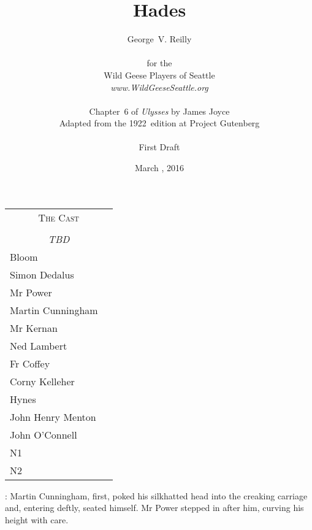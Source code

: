 


\title{\Huge Hades}
\author{George~V. Reilly\\
\\
{\small for the}\\
Wild Geese Players of Seattle\\
{\emph{www.WildGeeseSeattle.org}}\\
\\
{\small Chapter~6 of \emph{Ulysses} by James Joyce}\\
{\small Adapted from the 1922~edition at Project Gutenberg}
\\
\\
{\small First Draft}}
\date{March , 2016}
\raggedbottom



\maketitle
\thispagestyle{empty}
\pagebreak

\begin{tabular}{lp{10cm}}
    \multicolumn{2}{c}{\Large \textsc{The Cast}} \\
\\
    \multicolumn{2}{c}{\large \textit{TBD}} \\
Bloom \\
Simon Dedalus \\
Mr Power \\
Martin Cunningham \\
Mr Kernan \\
Ned Lambert \\
Fr Coffey \\
Corny Kelleher \\
Hynes \\
John Henry Menton \\
John O'Connell \\
N1 \\
N2 \\
\end{tabular}

\thispagestyle{empty}
\newpage


\setcounter{page}{1}


:
Martin Cunningham, first,
poked his silkhatted head into the creaking carriage
and, entering deftly, seated himself.
Mr Power stepped in after him,
curving his height with care.

